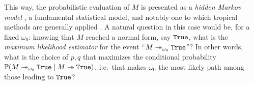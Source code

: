 This way, the probabilistic evaluation of $M$ is presented as a \emph{hidden Markov model} \cite{Baum1966}, a fundamental statistical model, and notably one to which tropical methods are generally applied \cite{Pachter2004}.
A natural question in this case would be, for a fixed $\omega_0$:
%
knowing that $M$ reached a normal form, say $\mathtt{True}$, %
 what is the \emph{maximum likelihood estimator} for the event ``$M\twoheadrightarrow_{\omega_0}\mathtt{True}$''? %
In other words, what is the choice of $p,q$ that maximizes the conditional probability $\mathbb{P}(M\twoheadrightarrow_{\omega_0} \mathtt{True}\mid M\twoheadrightarrow \mathtt{True})$, i.e.~that 
 makes $\omega_0$ the most likely path among those leading to $\mathtt{True}$?
%

